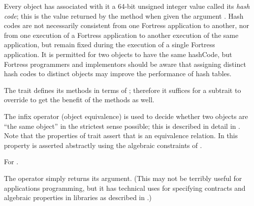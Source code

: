 
Every object has associated with it a 64-bit unsigned integer value called its \emph{hash code};
this is the value returned by the  method when given the argument .
Hash codes are not necessarily consistent from one Fortress application to another, nor from
one execution of a Fortress application to another execution of the same application,
but remain fixed during the execution of a single Fortress application.
It is permitted for two objects to have the same hashCode, but Fortress programmers and
implementors should be aware that assigning distinct hash codes to distinct objects
may improve the performance of hash tables.

The trait  defines its  methods in terms of ;
therefore it suffices for a subtrait to override  to get the benefit
of the  methods as well.



The infix operator \EXP{\sequiv} (object equivalence) is used to
decide whether two objects are ``the same object'' in the strictest
sense possible; this is described in detail in .
Note that the properties of trait  assert that \EXP{\sequiv}
is an equivalence relation.  In  this property is asserted abstractly using the algebraic constraints of .

For \EXP{\not\sequiv} .


The operator  simply returns its argument.  (This may not be
terribly useful for applications programming, but it has technical uses for
specifying contracts and algebraic properties in libraries as described in
.)



